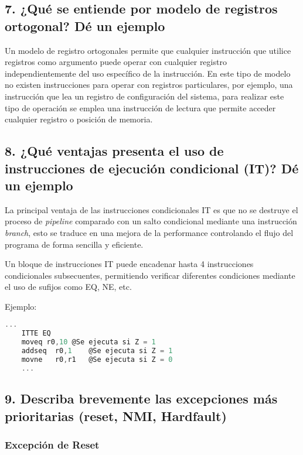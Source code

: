 \documentclass[10pt,a4paper,twoside,spanish]{article}	%
\begin{document}
\subsection*{7. ¿Qué se entiende por modelo de registros ortogonal? Dé un ejemplo}

Un modelo de registro ortogonales permite que cualquier instrucción que utilice registros como argumento puede operar con cualquier registro independientemente del uso específico de la instrucción. En este tipo de modelo no existen instrucciones para operar con registros particulares, por ejemplo, una instrucción que lea un registro de configuración del sistema, para realizar este tipo de operación se emplea una instrucción de lectura que permite acceder cualquier registro o posición de memoria.


\subsection*{8. ¿Qué ventajas presenta el uso de instrucciones de ejecución condicional (IT)? Dé un ejemplo}

La principal ventaja de las instrucciones condicionales IT es que no se destruye el proceso de \textit{pipeline} comparado con un salto condicional mediante una instrucción \textit{branch}, esto se traduce en una mejora de la performance controlando el flujo del programa de forma sencilla y eficiente.

Un bloque de instrucciones IT puede encadenar hasta 4 instrucciones condicionales subsecuentes, permitiendo verificar diferentes condiciones mediante el uso de sufijos como EQ, NE, etc.

Ejemplo:

\begin{lstlisting}[language=C]
	...
	ITTE EQ
	moveq r0,10	@Se ejecuta si Z = 1
	addseq	r0,1	@Se ejecuta si Z = 1
	movne	r0,r1	@Se ejecuta si Z = 0		
	...

\end{lstlisting}


\subsection*{9. Describa brevemente las excepciones más prioritarias (reset, NMI, Hardfault)}

\subsubsection*{Excepción de Reset}
\end{document}
